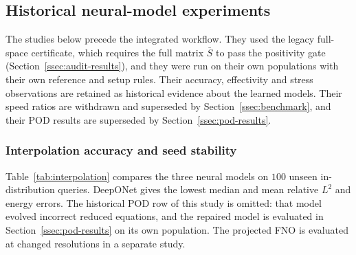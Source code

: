 \documentclass[11pt]{amsart}
\theoremstyle{remark}
\begin{document}
\subsection{Historical neural-model experiments}
\label{ssec:historical}

The studies below precede the integrated workflow. They used the legacy
full-space certificate, which requires the full matrix $\bar S$ to pass the
positivity gate (Section~\ref{ssec:audit-results}), and they were run on
their own populations with their own reference and setup rules. Their
accuracy, effectivity and stress observations are retained as historical
evidence about the learned models. Their speed ratios are withdrawn and
superseded by Section~\ref{ssec:benchmark}, and their POD results are
superseded by Section~\ref{ssec:pod-results}.

\subsubsection{Interpolation accuracy and seed stability}
\label{ssec:interpolation-results}

Table~\ref{tab:interpolation} compares the three neural models on $100$
unseen in-distribution queries.  DeepONet gives the lowest median and mean
relative $L^2$ and energy errors.  The historical POD row of this study is
omitted: that model evolved incorrect reduced equations, and the repaired
model is evaluated in Section~\ref{ssec:pod-results} on its own population.
The projected FNO is evaluated at changed resolutions in a separate study.

\begin{table}[ht]
\centering
\caption{Historical interpolation statistics on $100$ unseen queries (legacy POD row omitted, see text). Relative $L^2$ is the maximum-in-time mass-norm error divided by the
maximum-in-time reference mass norm. Price error is terminal ATM error
against the stored Galerkin reference. The full-space energy diagnostic
requires separate gate eligibility and is not certified pointwise accuracy.}
\label{tab:interpolation}
\small
{}
\end{table}
\end{document}
